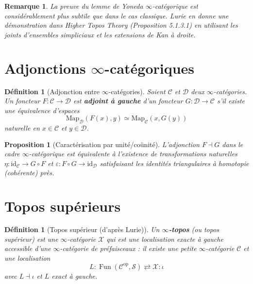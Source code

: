 \documentclass[a4paper,12pt]{book}
\DeclareMathOperator{\Fun}{Fun}
\newcommand{\op}{\mathrm{op}}
\newcommand{\id}{\mathrm{id}}
\newtheorem{proposition}[theoreme]{Proposition}
\newtheorem{definition}[theoreme]{Définition}
\newtheorem*{remarque}{Remarque}
\begin{document}
\begin{remarque}\label{rem:yoneda-infty-subtil}
La preuve du lemme de Yoneda $\infty$-catégorique est considérablement
plus subtile que dans le cas classique.
Lurie en donne une démonstration dans \emph{Higher Topos Theory}
(Proposition 5.1.3.1) en utilisant les joints d'ensembles
simpliciaux et les extensions de Kan à droite.
\end{remarque}

\section{Adjonctions $\infty$-catégoriques}\label{sec:adjonctions-infty}

\begin{definition}[Adjonction entre $\infty$-catégories]
\label{def:adjonction-infty}
Soient $\mathcal{C}$ et $\mathcal{D}$ deux $\infty$-catégories.
Un foncteur $F \colon \mathcal{C} \to \mathcal{D}$ est
\textbf{adjoint à gauche} d'un foncteur
$G \colon \mathcal{D} \to \mathcal{C}$ s'il existe une
équivalence d'espaces
\[
  \mathrm{Map}_\mathcal{D}(F(x), y)
  \simeq
  \mathrm{Map}_\mathcal{C}(x, G(y))
\]
naturelle en $x \in \mathcal{C}$ et $y \in \mathcal{D}$.
\end{definition}

\begin{proposition}[Caractérisation par unité/coünité]
\label{prop:adjonction-infty-unite}
L'adjonction $F \dashv G$ dans le cadre $\infty$-catégorique est
équivalente à l'existence de transformations naturelles
$\eta \colon \id_\mathcal{C} \to G \circ F$ et
$\varepsilon \colon F \circ G \to \id_\mathcal{D}$
satisfaisant les identités triangulaires à homotopie (cohérente) près.
\end{proposition}

\section{Topos supérieurs}\label{sec:topos-superieurs}


\begin{definition}[Topos supérieur (d'après Lurie)]
\label{def:topos-superieur}
Un \textbf{$\infty$-topos} (ou topos supérieur) est une
$\infty$-catégorie $\mathcal{X}$ qui est une localisation exacte
à gauche accessible d'une $\infty$-catégorie de préfaisceaux :
il existe une petite $\infty$-catégorie $\mathcal{C}$ et une
localisation
\[
  L \colon \Fun(\mathcal{C}^\op, \mathcal{S})
  \rightleftarrows \mathcal{X} :\! \iota
\]
avec $L \dashv \iota$ et $L$ exact à gauche.
\end{definition}
\end{document}
